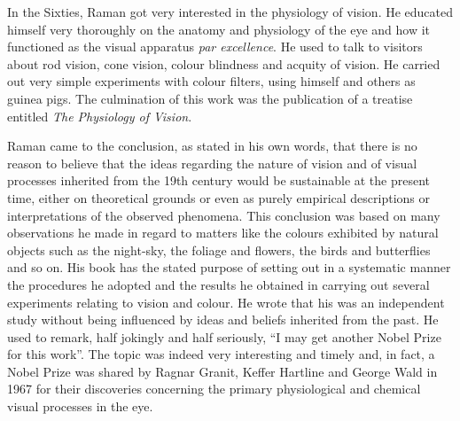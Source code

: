 \medskip
{}
\smallskip


\noindent
In the Sixties, Raman got very interested in the physiology
of vision. He educated himself very thoroughly on the anatomy
and \hbox{physiology} of the eye and how it functioned as the visual
apparatus {\em par excellence}. He used to talk to visitors about rod
vision, cone vision, colour blindness and acquity of vision.
He carried out very simple experiments with colour filters, using
himself and others as guinea pigs. The culmination of this work
was the publication of a treatise entitled {\em The Physiology of Vision}.

Raman came to the conclusion, as stated in his own words,
that there is no reason to believe that the ideas regarding the nature
of vision and of visual processes inherited from the 19th century
would be sustainable at the present time, either on theoretical
grounds or even as purely empirical descriptions or interpretations
of the observed phenomena. This conclusion was based on many
observations he made in regard to matters like the colours
exhibited by natural objects such as the night-sky, the foliage and
flowers, the birds and butterflies and so on. His book has the
stated purpose of setting out in a systematic manner the
procedures he adopted and the results he obtained in carrying
out several experiments relating to vision and colour. He wrote
that his was an independent study without being influenced by
ideas and beliefs inherited from the past. He used to remark, half
jokingly and half seriously, ``I may get another Nobel Prize for
this work''. The topic was indeed very interesting and timely and,
in fact, a Nobel Prize was shared by Ragnar Granit, Keffer
Hartline and George Wald in 1967 for their discoveries concerning
the primary physiological and chemical visual processes in the eye.


